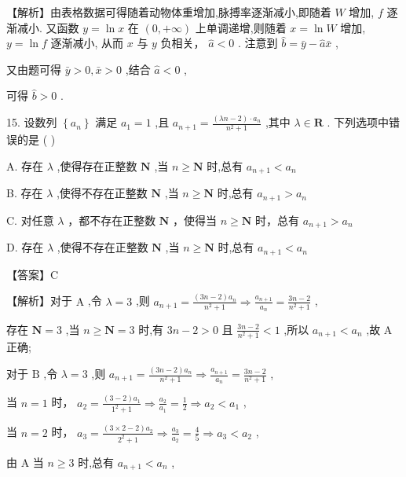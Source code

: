 \documentclass[10pt]{article}
\begin{document}
【解析】由表格数据可得随着动物体重增加,脉搏率逐渐减小,即随着 \(W\) 增加, \(f\) 逐渐减小. 又函数 \(y = \ln x\) 在 \(\left( {0, + \infty }\right)\) 上单调递增,则随着 \(x = \ln W\) 增加, \(y = \ln f\) 逐渐减小, 从而 \(x\) 与 \(y\) 负相关， \(\widehat{a} < 0\) . 注意到 \(\widehat{b} = \bar{y} - \widehat{a}\bar{x}\) ,

又由题可得 \(\bar{y} > 0,\bar{x} > 0\) ,结合 \(\widehat{a} < 0\) ,

可得 \(\widehat{b} > 0\) .

15. 设数列 \(\left\{  {a}_{n}\right\}\) 满足 \({a}_{1} = 1\) ,且 \({a}_{n + 1} = \frac{\left( {{\lambda n} - 2}\right)  \cdot  {a}_{n}}{{n}^{2} + 1}\) ,其中 \(\lambda  \in  \mathbf{R}\) . 下列选项中错误的是 ( )

A. 存在 \(\lambda\) ,使得存在正整数 \(\mathbf{N}\) ,当 \(n \geq  \mathbf{N}\) 时,总有 \({a}_{n + 1} < {a}_{n}\)

B. 存在 \(\lambda\) ,使得不存在正整数 \(\mathbf{N}\) ,当 \(n \geq  \mathbf{N}\) 时,总有 \({a}_{n + 1} > {a}_{n}\)

C. 对任意 \(\lambda\) ，都不存在正整数 \(\mathbf{N}\) ，使得当 \(n \geq  \mathbf{N}\) 时，总有 \({a}_{n + 1} > {a}_{n}\)

D. 存在 \(\lambda\) ,使得不存在正整数 \(\mathbf{N}\) ,当 \(n \geq  \mathbf{N}\) 时,总有 \({a}_{n + 1} < {a}_{n}\)

【答案】C

【解析】对于 \(\mathrm{A}\) ,令 \(\lambda  = 3\) ,则 \({a}_{n + 1} = \frac{\left( {{3n} - 2}\right) {a}_{n}}{{n}^{2} + 1} \Rightarrow  \frac{{a}_{n + 1}}{{a}_{n}} = \frac{{3n} - 2}{{n}^{2} + 1}\) ,

存在 \(\mathbf{N} = 3\) ,当 \(n \geq  \mathbf{N} = 3\) 时,有 \({3n} - 2 > 0\) 且 \(\frac{{3n} - 2}{{n}^{2} + 1} < 1\) ,所以 \({a}_{n + 1} < {a}_{n}\) ,故 \(\mathrm{A}\) 正确;

对于 \(\mathrm{B}\) ,令 \(\lambda  = 3\) ,则 \({a}_{n + 1} = \frac{\left( {{3n} - 2}\right) {a}_{n}}{{n}^{2} + 1} \Rightarrow  \frac{{a}_{n + 1}}{{a}_{n}} = \frac{{3n} - 2}{{n}^{2} + 1}\) ,

当 \(n = 1\) 时， \({a}_{2} = \frac{\left( {3 - 2}\right) {a}_{1}}{{1}^{2} + 1} \Rightarrow  \frac{{a}_{2}}{{a}_{1}} = \frac{1}{2} \Rightarrow  {a}_{2} < {a}_{1}\) ,

当 \(n = 2\) 时， \({a}_{3} = \frac{\left( {3 \times  2 - 2}\right) {a}_{2}}{{2}^{2} + 1} \Rightarrow  \frac{{a}_{3}}{{a}_{2}} = \frac{4}{5} \Rightarrow  {a}_{3} < {a}_{2}\) ,

由 \(\mathrm{A}\) 当 \(n \geq  3\) 时,总有 \({a}_{n + 1} < {a}_{n}\) ,
\end{document}
